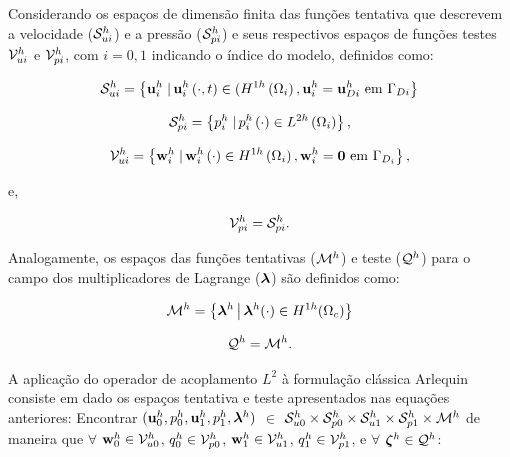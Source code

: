 \documentclass[tese_patricia]{subfiles}
\begin{document}
Considerando os espaços de dimensão finita das funções tentativa que descrevem a velocidade ($\mathcal{S}_{ui}^h$) e a pressão ($\mathcal{S}_{pi}^h$) e seus respectivos espaços de funções testes $\mathcal{V}_{ui}^h$ e $\mathcal{V}_{pi}^h$, com $i = 0,1$ indicando o índice do modelo, definidos como:

\begin{align}
	\mathcal{S}_{ui}^h = \left\{\mathbf{u}_{i}^{h} \left . \right| \mathbf{u}_{i}^{h} \left(\cdot,t\right) \in (H^{1h}\left(\Omega_i\right), \mathbf{u}_{i}^{h} = \mathbf{u}_{Di}^{h} \textrm { em}  \ \Gamma_{Di} \right\}
\end{align}

\begin{align}
	\mathcal{S}_{pi}^h = \left\{p_{i}^{h} \left . \right| p_{i}^{h} \left(\cdot\right) \in L^{2h}\left(\Omega_i\right) \right\},
\end{align}

\begin{align}
	\mathcal{V}_{ui}^h = \left\{\mathbf{w}_{i}^{h} \left . \right| \mathbf{w}_{i}^{h} \left(\cdot\right) \in H^{1h}\left(\Omega_i\right), \mathbf{w}_{i}^{h} = \mathbf{0}  \textrm { em} \ \Gamma_{D_i} \right\},
\end{align}

e,

\begin{align}
	\mathcal{V}_{pi}^h = \mathcal{S}_{pi}^h.
\end{align}

Analogamente, os espaços das funções tentativas ($\mathcal{M}^h$) e teste ($\mathcal{Q}^h$) para o campo dos multiplicadores de Lagrange ($\boldsymbol{\lambda}$) são definidos como:

\begin{align}
	\mathcal{M}^h = \left\{ \boldsymbol{\lambda}^{h} \,\middle|\, \boldsymbol{\lambda}^{h}(\cdot) \in H^{1h}(\Omega_c) \right\}
\end{align}


\begin{align}
	\mathcal{Q}^h = \mathcal{M}^h.
\end{align}

A aplicação do operador de acoplamento $L^{2}$ à formulação clássica Arlequin consiste em dado os espaços tentativa e teste apresentados nas equações anteriores: Encontrar $(\mathbf{u}_0^h,p_0^h,\mathbf{u}_1^h,p_1^h,\boldsymbol{\lambda}^h)$ $\in$ $\mathcal{S}_{u0}^h \times \mathcal{S}_{p0}^h \times \mathcal{S}_{u1}^h \times \mathcal{S}_{p1}^h \times \mathcal{M}^h$ de maneira que  $\forall$ $\mathbf{w}_0^h \in \mathcal{V}_{u0}^h$, $q_0^h \in \mathcal{V}_{p0}^h$, $\mathbf{w}_1^h \in \mathcal{V}_{u1}^h$, $q_1^h \in \mathcal{V}_{p1}^h$, e $\forall$ $\boldsymbol{\zeta}^h \in \mathcal{Q}^h$:
\end{document}
